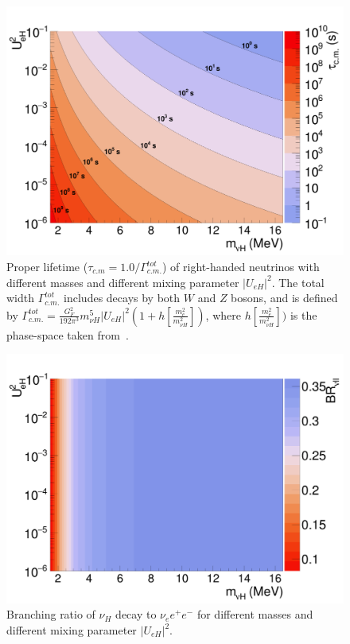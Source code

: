 \documentclass[%
 reprint,
 amsmath,amssymb,
 aps,
 prd,
floatfix,
twocolumn,
]{revtex4-1}
\begin{document}
\begin{figure}[!htbp]
\includegraphics[width=0.99\columnwidth]{../plots/RHNTauCM_vs_M_U2_contour_linXlogYlogZ.png}
\caption{Proper lifetime ($\tau_{c.m}=1.0/\Gamma_{c.m.}^{tot}$) of right-handed neutrinos with different masses and different mixing parameter $|U_{eH}|^2$. The total width $\Gamma_{c.m.}^{tot}$ includes decays by both $W$ and $Z$ bosons, and is defined by $\Gamma_{c.m.}^{tot} = \frac{G_F^2}{192\pi^3}m_{\nu H}^5 |U_{eH}|^2 (1 + h\left[\frac{m_e^2}{m_{\nu H}^2}\right])$, where $h\left[\frac{m_e^2}{m_{\nu H}^2}\right])$ is the phase-space taken from~\cite{gorbunov2007TauCM}.}
\label{fig:RHNCTau} 
\end{figure}

\begin{figure}[!htbp]
\includegraphics[width=0.99\columnwidth]{../plots/RHNBRvll_vs_M_U2_linXlogYlinZ.png}
\caption{Branching ratio of $\nu_H$ decay to $\nu_e e^+ e^-$ for different masses and different mixing parameter $|U_{eH}|^2$. }
\label{fig:RHNBRvll} 
\end{figure}
\end{document}
